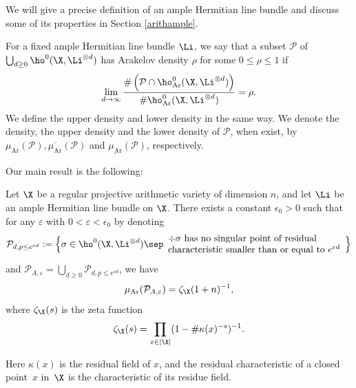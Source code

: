 We will give a precise definition of an ample Hermitian line bundle and discuss some of its properties in Section \ref{arithample}.

For a fixed ample Hermitian line bundle $\Li$, we say that a subset $\mathcal{P}$ of $\bigcup_{d\geq 0}\ho^0(\X, \Li^{\otimes d})$ has Arakelov density $\rho$ for some $0\leq \rho\leq 1$ if
\[
\lim_{d\to \infty} \frac{ \#\left(\mathcal{P}\cap \ho_{\mathrm{Ar}}^0(\X, \Li^{\otimes d})\right) }{\#\ho_{\mathrm{Ar}}^0(\X, \Li^{\otimes d})}=\rho.
\]
We define the upper density and lower density in the same way. We denote the density, the upper density and the lower density of $\mathcal{P}$, when exist, by $\mu_{\mathrm{Ar}}(\mathcal{P}),\overline{\mu_{\mathrm{Ar}}}(\mathcal{P})$ and $\underline{\mu_{\mathrm{Ar}}}(\mathcal{P})$, respectively.

Our main result is the following:

\begin{thm}\label{mainvar}
Let $\X$ be a regular projective arithmetic variety of dimension $n$, and let $\Li$ be an ample Hermitian line bundle on $\X$.
There exists a constant $\epsilon_0>0$ such that for any $\varepsilon$ with $0<\varepsilon<\epsilon_0$ by denoting
\[
\mathcal{P}_{d,p\leq e^{\varepsilon d}}:=\Bigl\{ \sigma\in \ho^0(\X,\Li^{\otimes d})\sep \begin{array}{ll}
\div \sigma \text{ has no singular point of residual} \\
\text{characteristic smaller than or equal to } e^{\varepsilon d}
\end{array}\Bigr\}
\]
and $\mathcal{P}_{A,\varepsilon}=\bigcup_{d\geq 0} \mathcal{P}_{d,p\leq e^{\varepsilon d}}$, we have
\[
\mu_{\mathrm{Ar}}(\mathcal{P}_{A,\varepsilon})=\zeta_{\X}(1+n)^{-1},
\]
where $\zeta_{\X}(s)$ is the zeta function
\[
\zeta_{\X}(s)= \prod_{x\in |\X|}(1-\#\kappa(x)^{-s})^{-1}.
\]
\end{thm}
Here $\kappa(x)$ is the residual field of $x$, and the residual characteristic of a closed point~$x$ in~$\X$ is the characteristic of its residue field.

